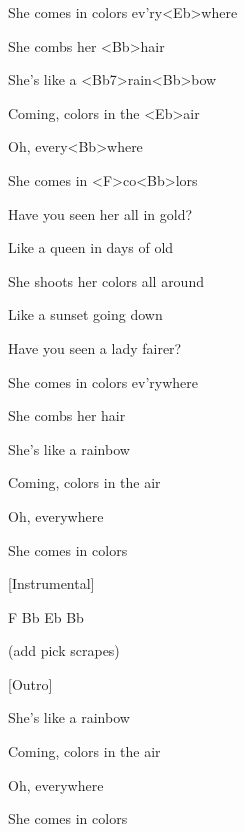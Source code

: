 She comes in colors ev'ry<Eb>where

She combs her <Bb>hair

She's like a <Bb7>rain<Bb>bow

Coming, colors in the <Eb>air

Oh, every<Bb>where

She comes in <F>co<Bb>lors
\ks


\zs
Have you seen her all in gold?

Like a queen in days of old

She shoots her colors all around

Like a sunset going down

Have you seen a lady fairer?

She comes in colors ev'rywhere

She combs her hair

She's like a rainbow

Coming, colors in the air

Oh, everywhere

She comes in colors
\ks

[Instrumental]

F  Bb    Eb   Bb

(add pick scrapes)


[Outro]

She's like a rainbow


Coming, colors in the air

Oh, everywhere

She comes in colors
\kp

